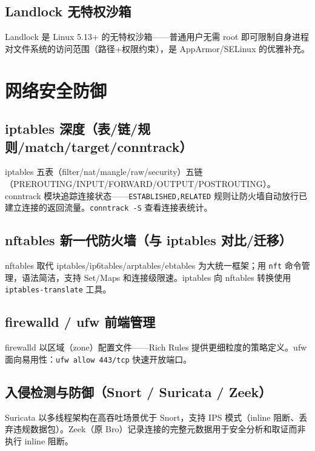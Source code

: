 \documentclass[12pt,UTF8]{ctexbook}
\begin{document}
  \section{Landlock 无特权沙箱}

Landlock 是 Linux 5.13+ 的无特权沙箱——普通用户无需 root 即可限制自身进程对文件系统的访问范围（路径+权限约束），是 AppArmor/SELinux 的优雅补充。


\chapter{网络安全防御}
\label{chap:network-defense}

  \section{iptables 深度（表/链/规则/match/target/conntrack）}

iptables 五表（filter/nat/mangle/raw/security）五链（PREROUTING/INPUT/FORWARD/OUTPUT/POSTROUTING）。conntrack 模块追踪连接状态——\verb|ESTABLISHED,RELATED| 规则让防火墙自动放行已建立连接的返回流量。\verb|conntrack -S| 查看连接表统计。

  \section{nftables 新一代防火墙（与 iptables 对比/迁移）}

nftables 取代 iptables/ip6tables/arptables/ebtables 为大统一框架；用 \verb|nft| 命令管理，语法简洁，支持 Set/Maps 和连接级限速。iptables 向 nftables 转换使用 \verb|iptables-translate| 工具。

  \section{firewalld / ufw 前端管理}

firewalld 以区域（zone）配置文件——Rich Rules 提供更细粒度的策略定义。ufw 面向易用性：\verb|ufw allow 443/tcp| 快速开放端口。

  \section{入侵检测与防御（Snort / Suricata / Zeek）}

Suricata 以多线程架构在高吞吐场景优于 Snort，支持 IPS 模式（inline 阻断、丢弃违规数据包）。Zeek（原 Bro）记录连接的完整元数据用于安全分析和取证而非执行 inline 阻断。
\end{document}
